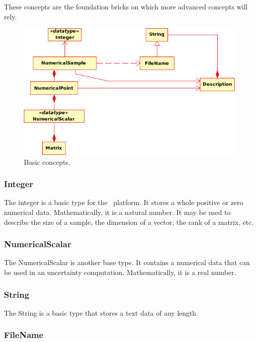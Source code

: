 These concepts are the foundation bricks on which more advanced concepts will rely.

\begin{figure}[htb]
  \begin{center}
    \includegraphics[scale=0.7]{Figures/analysis/basic_concepts.png}
    \caption{Basic concepts.}\label{fig:basic_concepts}
  \end{center}
\end{figure}

\subsubsection{Integer}

The integer is a basic type for the \OT\ platform. It stores a whole positive or zero numerical data. Mathematically, it is a natural number. It may be used to describe the size of a sample, the dimension of a vector, the rank of a matrix, etc.

\subsubsection{NumericalScalar}

The NumericalScalar is another base type. It contains a numerical data that can be used in an uncertainty computation. Mathematically, it is a real number.

\subsubsection{String}

The String is a basic type that stores a text data of any length.

\subsubsection{FileName}

